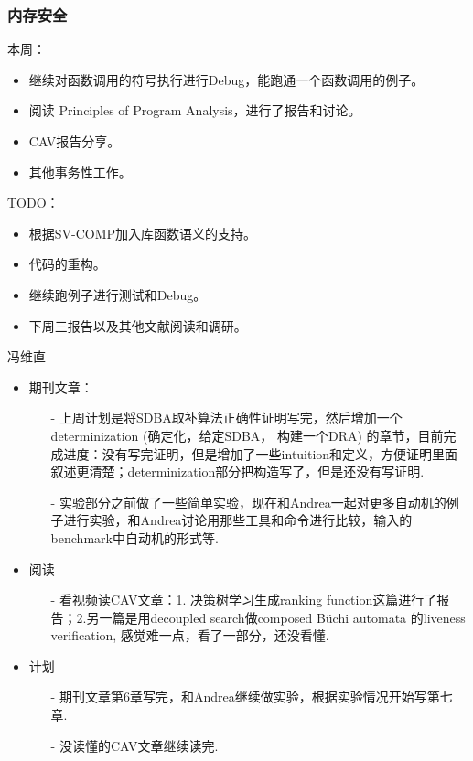 \documentclass[aspectratio=1610, 13pt]{beamer}
\newcommand{\buchi}{B\"uchi }
\begin{document}
\begin{frame}\frametitle{内存安全}
本周：
\begin{itemize}
\item 继续对函数调用的符号执行进行Debug，能跑通一个函数调用的例子。
\item 阅读 Principles of Program Analysis，进行了报告和讨论。
\item CAV报告分享。
\item 其他事务性工作。
\end{itemize}


TODO：
\begin{itemize}
\item 根据SV-COMP加入库函数语义的支持。
\item 代码的重构。
\item 继续跑例子进行测试和Debug。
\item 下周三报告以及其他文献阅读和调研。
\end{itemize}



\end{frame}
\begin{frame}{冯维直}
    \begin{itemize}
        \item 期刊文章：
        \begin{itemize}
            \item [-] 上周计划是将SDBA取补算法正确性证明写完，然后增加一个determinization (确定化，给定SDBA， 构建一个DRA) 的章节，目前完成进度：没有写完证明，但是增加了一些intuition和定义，方便证明里面叙述更清楚；determinization部分把构造写了，但是还没有写证明.
            \item [-] 实验部分之前做了一些简单实验，现在和Andrea一起对更多自动机的例子进行实验，和Andrea讨论用那些工具和命令进行比较，输入的benchmark中自动机的形式等.
        \end{itemize}
        \item 阅读
        \begin{itemize}
            \item [-] 看视频读CAV文章：1. 决策树学习生成ranking function这篇进行了报告；2.另一篇是用decoupled search做composed \buchi automata 的liveness verification, 感觉难一点，看了一部分，还没看懂. 
        \end{itemize}
        \item 计划
        \begin{itemize}
            \item [-] 期刊文章第6章写完，和Andrea继续做实验，根据实验情况开始写第七章.
            \item [-] 没读懂的CAV文章继续读完.
        \end{itemize}
\end{itemize}    
\end{frame}
\end{document}
